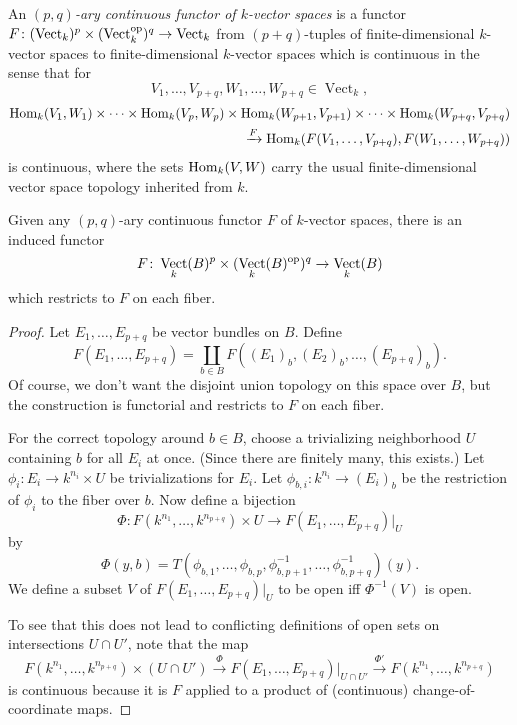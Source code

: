 \documentclass[a4paper,openany]{scrbook}
\DeclareMathOperator{\Vect}{Vect}
\begin{document}
\begin{defn}
An \emph{$(p,q)$-ary continuous functor of $k$-vector spaces} is a functor $F\colon (\Vect_k)^p \times (\Vect_k^\op)^q \to \Vect_k$ from $(p+q)$-tuples of finite-dimensional $k$-vector spaces to finite-dimensional $k$-vector spaces which is continuous in the sense that for
\[
V_1,\dots,V_{p+q}, W_1,\dots,W_{p+q} \in \Vect_k,
\]
\begin{align*}
\operatorname{Hom}_k(V_1,W_1) \times \cdots \times \operatorname{Hom}_k(V_{p},W_{p}) \times \operatorname{Hom}_k(W_{p+1},V_{p+1}) \times \cdots \times \operatorname{Hom}_k(W_{p+q},V_{p+q}) \\
\xrightarrow{F} \operatorname{Hom}_k(F(V_1,\dots,V_{p+q}),F(W_1,\dots,W_{p+q}))
\end{align*}
is continuous, where the sets $\operatorname{Hom}_k(V,W)$ carry the usual finite-dimensional vector space topology inherited from $k$.
\end{defn} 

\begin{prop}\label{prop:continuousfunctorlift}
Given any $(p,q)$-ary continuous functor $F$ of $k$-vector spaces, there is an induced functor
\[
F\colon \Vect_k(B)^p \times (\Vect_k(B)^\op)^q \to \Vect_k(B)
\]
which restricts to $F$ on each fiber.
\end{prop}
\begin{proof}
Let $E_1,\dots,E_{p+q}$ be vector bundles on $B$. Define
\[
F(E_1,\dots,E_{p+q}) = \coprod_{b \in B} F((E_1)_b,(E_2)_b,\dots,(E_{p+q})_b).
\]
Of course, we don't want the disjoint union topology on this space over $B$, but the construction is functorial and restricts to $F$ on each fiber.

For the correct topology around $b \in B$, choose a trivializing neighborhood $U$ containing $b$ for all $E_i$ at once. (Since there are finitely many, this exists.) Let $\phi_i\colon E_i \to k^{n_i} \times U$ be trivializations for $E_i$. Let $\phi_{b,i}\colon k^{n_i} \to (E_i)_b$ be the restriction of $\phi_i$ to the fiber over $b$. Now define a bijection
\[
\Phi\colon F(k^{n_1},\dots,k^{n_{p+q}}) \times U \to F(E_1,\dots,E_{p+q})|_U
\]
by
\[
\Phi(y,b) = T(\phi_{b,1},\dots,\phi_{b,p},\phi_{b,p+1}^{-1},\dots,\phi_{b,p+q}^{-1})(y).
\]
We define a subset $V$ of $F(E_1,\dots,E_{p+q})|_U$ to be open iff $\Phi^{-1}(V)$ is open.

To see that this does not lead to conflicting definitions of open sets on intersections $U \cap U'$, note that the map
\[
F(k^{n_1},\dots,k^{n_{p+q}}) \times (U \cap U') \xrightarrow{\Phi} F(E_1,\dots,E_{p+q})|_{U\cap U'} \xrightarrow{\Phi'} F(k^{n_1},\dots,k^{n_{p+q}})
\]
is continuous because it is $F$ applied to a product of (continuous) change-of-coordinate maps.
\end{proof}
\end{document}
